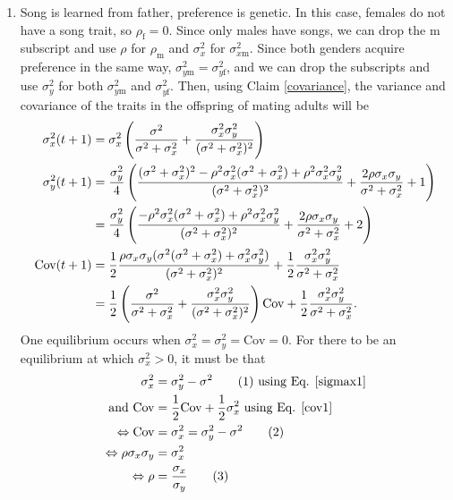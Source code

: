\documentclass{article}
\newcommand{\x}[1]{\text{#1}}
\newcommand{\Cov}{\text{Cov}}
\newcommand\numberthis{\addtocounter{equation}{1}\tag{\theequation}}
\begin{document}
\begin{enumerate}
\item Song is learned from father, preference is genetic. In this case, females do not have a song trait, so $\rho_\x{f}=0$. Since only males have songs, we can drop the m subscript and use $\rho$ for $\rho_\x{m}$ and $\sigma_x^2$ for $\sigma_{x\x{m}}^2$. Since both genders acquire preference in the same way, $\sigma_{y\x{m}}^2=\sigma_{y\x{f}}^2$, and we can drop the subscripts and use $\sigma_y^2$ for both $\sigma_{y\x{m}}^2$ and $\sigma_{y\x{f}}^2$. Then, using Claim \ref{covariance}, the variance and covariance of the traits in the offspring of mating adults will be 
\begin{align}
\sigma_x^2(t+1)&=\sigma_x^2\left(\frac{\sigma^2}{\sigma^2+\sigma_x^2}+\frac{\sigma_x^2\sigma_y^2}{(\sigma^2+\sigma_x^2)^2}\right) \label{sigmax1}
\\ \sigma_y^2(t+1)&=\frac{\sigma_y^2}{4}\left(\frac{(\sigma^2+\sigma_x^2)^2-\rho^2\sigma_x^2(\sigma^2+\sigma_x^2)+\rho^2\sigma_x^2\sigma_y^2}{(\sigma^2+\sigma_x^2)^2}+\frac{2\rho\sigma_x\sigma_y}{\sigma^2+\sigma_x^2}+1\right) \notag
\\&=\frac{\sigma_y^2}{4}\left(\frac{-\rho^2\sigma_x^2(\sigma^2+\sigma_x^2)+\rho^2\sigma_x^2\sigma_y^2}{(\sigma^2+\sigma_x^2)^2}+\frac{2\rho\sigma_x\sigma_y}{\sigma^2+\sigma_x^2}+2\right) \label{sigmay1}
\\ \Cov(t+1)&=\frac{1}{2}\frac{\rho\sigma_x\sigma_y(\sigma^2(\sigma^2+\sigma_x^2)+\sigma_x^2\sigma_y^2)}{(\sigma^2+\sigma_x^2)^2}+\frac{1}{2}\frac{\sigma_x^2\sigma_y^2}{\sigma^2+\sigma_x^2} \notag
\\&=\frac{1}{2}\left(\frac{\sigma^2}{\sigma^2+\sigma_x^2}+\frac{\sigma_x^2\sigma_y^2}{(\sigma^2+\sigma_x^2)^2}\right)\Cov+\frac{1}{2}\frac{\sigma_x^2\sigma_y^2}{\sigma^2+\sigma_x^2}. \label{cov1}
\end{align}
One equilibrium occurs when $\sigma_x^2=\sigma_y^2=\Cov=0$. For there to be an equilibrium at which $\sigma_x^2>0$, it must be that 
\begin{align*}
\sigma_x^2&=\sigma_y^2-\sigma^2 \numberthis \label{sigmax_condition} \text{ using Eq. \ref{sigmax1}}
\\ \text{ and }
\Cov&=\frac{1}{2}\Cov+\frac{1}{2}\sigma_x^2 \text{ using Eq. \ref{cov1}}
\\ \Leftrightarrow \Cov&=\sigma_x^2=\sigma_y^2-\sigma^2 \numberthis \label{cov_condition}
\\ \Leftrightarrow  \rho\sigma_x\sigma_y&=\sigma_x^2
\\ \Leftrightarrow \rho & = \frac{\sigma_x}{\sigma_y}  \numberthis \label{rho_condition}

\end{align*}
\end{enumerate}
\end{document}
